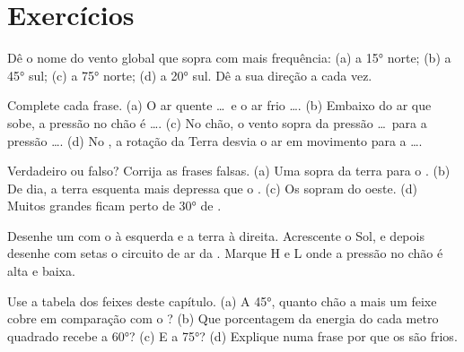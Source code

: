 \section{Exercícios}

\begin{exercise}[$\star$]\label{exo:g8:winds-global-circulation:1}
Dê o nome do vento global que sopra com mais frequência: (a) a \ang{15}
norte; (b) a \ang{45} sul; (c) a \ang{75} norte; (d) a \ang{20} sul. Dê
a sua direção a cada vez.
\end{exercise}

\begin{exercise}[$\star$]\label{exo:g8:winds-global-circulation:2}
Complete cada frase. (a) O ar quente \dots\ e o ar frio \dots. (b) Embaixo
do ar que sobe, a pressão no chão é \dots. (c) No chão, o vento sopra da
pressão \dots\ para a pressão \dots. (d) No , a rotação
da Terra desvia o ar em movimento para a \dots.
\end{exercise}

\begin{exercise}[$\star$]\label{exo:g8:winds-global-circulation:3}
Verdadeiro ou falso? Corrija as frases falsas. (a) Uma 
sopra da terra para o . (b) De dia, a terra esquenta mais depressa que
o . (c) Os  sopram do oeste. (d) Muitos grandes  ficam
perto de \ang{30} de .
\end{exercise}

\begin{exercise}[$\star$]\label{exo:g8:winds-global-circulation:4}
Desenhe um  com o  à esquerda e a terra à direita. Acrescente o
Sol, e depois desenhe com setas o circuito de ar da . Marque
H e L onde a pressão no chão é alta e baixa.
\end{exercise}

\begin{exercise}[$\star\star$]\label{exo:g8:winds-global-circulation:5}
Use a tabela dos feixes deste capítulo. (a) A \ang{45}, quanto chão a
mais um feixe cobre em comparação com o ? (b) Que porcentagem da
energia do  cada metro quadrado recebe a \ang{60}? (c) E a
\ang{75}? (d) Explique numa frase por que os  são frios.
\end{exercise}

